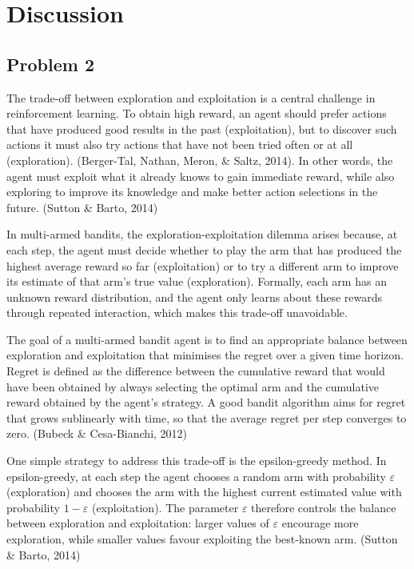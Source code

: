\documentclass[11pt]{article}
\begin{document}
\section*{\LARGE Discussion}
\subsection*{Problem 2}

The trade-off between exploration and exploitation is a central challenge in reinforcement learning. To obtain high reward, an agent should prefer actions that have produced good results in the past (exploitation), but to discover such actions it must also try actions that have not been tried often or at all (exploration). (Berger-Tal, Nathan, Meron, \& Saltz, 2014). In other words, the agent must exploit what it already knows to gain immediate reward, while also exploring to improve its knowledge and make better action selections in the future. (Sutton \& Barto, 2014)

In multi-armed bandits, the exploration-exploitation dilemma arises because, at each step, the agent must decide whether to play the arm that has produced the highest average reward so far (exploitation) or to try a different arm to improve its estimate of that arm's true value (exploration). Formally, each arm has an unknown reward distribution, and the agent only learns about these rewards through repeated interaction, which makes this trade-off unavoidable.

The goal of a multi-armed bandit agent is to find an appropriate balance between exploration and exploitation that minimises the regret over a given time horizon. Regret is defined as the difference between the cumulative reward that would have been obtained by always selecting the optimal arm and the cumulative reward obtained by the agent's strategy. A good bandit algorithm aims for regret that grows sublinearly with time, so that the average regret per step converges to zero. (Bubeck \& Cesa-Bianchi, 2012)

One simple strategy to address this trade-off is the epsilon-greedy method. In epsilon-greedy, at each step the agent chooses a random arm with probability $\varepsilon $ (exploration) and chooses the arm with the highest current estimated value with probability  $1-\varepsilon $ (exploitation). The parameter $\varepsilon $ therefore controls the balance between exploration and exploitation: larger values of $\varepsilon $ encourage more exploration, while smaller values favour exploiting the best-known arm. (Sutton \& Barto, 2014)
\end{document}

